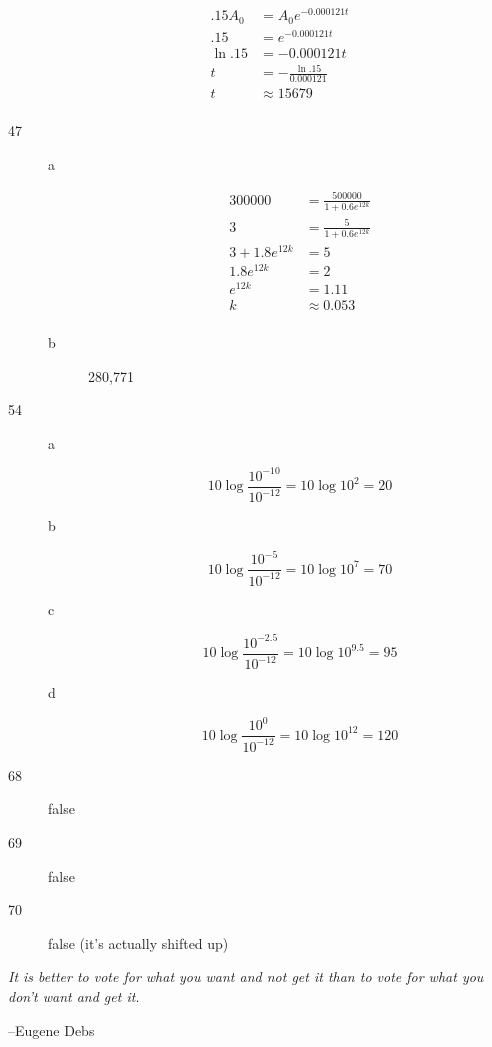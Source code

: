 \documentclass[fleqn,addpoints]{exam}
\begin{document}
\begin{description}
\begin{align*}
  .15 A_0 &= A_0 e^{-0.000121 t} \\
  .15  &= e^{-0.000121 t} \\
  \ln .15  &= -0.000121 t \\
  t &= - \frac{\ln .15}{0.000121} \\
  t &\approx 15679 \\
\end{align*}

\item[47]

\begin{description}
\item[a]
\begin{align*}
  300000 &= \frac{500000}{1 + 0.6 e^{12k}} \\
  3 &= \frac{5}{1 + 0.6 e^{12k}} \\
  3 + 1.8 e^{12k} &= 5 \\
  1.8 e^{12k} &= 2 \\
  e^{12k} &= 1.11 \\
  k &\approx 0.053 \\
\end{align*}

\item[b]
280,771

\end{description}

\item[54]

\begin{description}
\item[a] 
\[
  10 \log \frac{10^{-10}}{10^{-12}} =   10 \log 10^2 = 20 
\]

\item[b] 
\[
  10 \log \frac{10^{-5}}{10^{-12}} =   10 \log 10^7 = 70
\]

\item[c] 
\[
  10 \log \frac{10^{-2.5}}{10^{-12}} =   10 \log 10^{9.5} = 95
\]

\item[d] 
\[
  10 \log \frac{10^{0}}{10^{-12}} =   10 \log 10^{12} = 120
\]

\end{description}

\item[68]
false

\item[69]
false

\item[70]
false (it's actually shifted up)

\end{description}

\else

\vspace{3 in}

{\em It is better to vote for what you want and not get it than to vote for what you don't want and get it.}

\vspace{.1 cm}
\hspace{1 cm} --Eugene Debs
\fi
\end{document}
